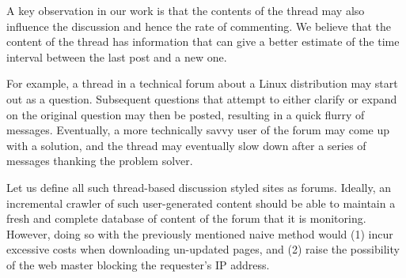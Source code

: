 A key observation in our work is that the contents of the thread may
also influence the discussion and hence the rate of commenting.  We
believe that the content of the thread has information that can give a
better estimate of the time interval between the last post and a new
one.

 For example, a thread in a technical forum about a Linux distribution may start 
out as a question. Subsequent questions that attempt to either clarify or expand 
on the original question may then be posted, resulting in a quick flurry of 
messages. Eventually, a more technically savvy user of the forum may come up 
with a solution, and the thread may eventually slow down after a series of 
messages thanking the problem solver. 


Let us define all such thread-based discussion styled sites as forums. Ideally, 
an incremental crawler of such user-generated content should be able to maintain 
a fresh and complete database of content of the forum that it is monitoring.  
However, doing so with the previously mentioned naive method would (1) incur 
excessive costs when downloading un-updated pages, and (2) raise the possibility 
of the web master blocking the requester's IP address.

